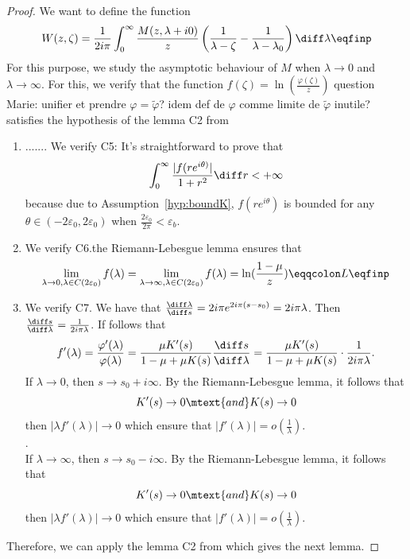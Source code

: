 \begin{proof}
We want to define the function
\begin{align}\label{def:W}
    W(z, \zeta) = \frac{1}{2i\pi }\int_0^\infty  \frac{M(z,\lambda+i0)}{z}\left( \frac{1}{\lambda-\zeta} - \frac{1}{\lambda-\lambda_0}\right) \diff \lambda 
    \eqfinp
\end{align}
For this purpose, we study the asymptotic behaviour of $M$ when $\lambda \to 0$ and $\lambda \to \infty$. For this, we verify that the function $f(\zeta) = \ln(\frac{\varphi(\zeta)}{z})$ {\MD question Marie: unifier et prendre $\varphi=\tilde\varphi$? idem def de $\varphi$ comme limite de $\tilde\varphi$ inutile?} satisfies the hypothesis of the lemma C2 from \cite{escobedo2007fundamental}
\begin{enumerate}
\item .......   We verify C5: It's straightforward to prove that 
    $$\int_0^\infty \frac{|f(r e^{i\theta)}|}{1+r^2}\diff r < +\infty$$ because due to Assumption~\ref{hyp:boundK}, $f(re^{i\theta})$ is bounded for any $\theta \in (-2\varepsilon_0, 2\varepsilon_0)$ when $\frac{2\varepsilon_0}{2\pi} < \varepsilon_b$. 
    \item We verify C6.the Riemann-Lebesgue lemma ensures that 
    $$ \lim_{\lambda \to 0, \lambda \in C(2\varepsilon_0)} f(\lambda) = 
     \lim_{\lambda \to \infty, \lambda \in C(2\varepsilon_0)} f(\lambda)=\ln(\frac{1-\mu}{z}) 
 \eqqcolon L\eqfinp$$
    \item We verify C7. We have that $\frac{\diff \lambda}{\diff s} = 2i\pi e^{2i\pi(s-s_0)} = 2i\pi \lambda$. Then 
    $\frac{\diff s}{\diff \lambda} = \frac{1}{2i\pi\lambda}$. 
    If follows that 
    $$f'(\lambda) = \frac{\varphi'(\lambda)}{\varphi(\lambda)} = \frac{\mu K'(s)}{1 - \mu + \mu K(s)}\frac{\diff s}{\diff \lambda} = \frac{\mu K'(s)}{1 - \mu + \mu K(s)} \cdot \frac{1}{2i\pi\lambda}. $$
    If $\lambda \to 0$, then $s \to s_0+i\infty$. By the Riemann-Lebesgue lemma, it follows that $$K'(s) \to 0 \mtext{and} K(s) \to 0$$ then  $|\lambda f'(\lambda)| \to 0$ which ensure that $|f'(\lambda)| = o(\frac{1}{\lambda})$. \\. \\
    If $\lambda \to \infty$, then $s \to s_0-i\infty$. By the Riemann-Lebesgue lemma, it follows that $$K'(s) \to 0 \mtext{and} K(s) \to 0$$ then  $|\lambda f'(\lambda)| \to 0$ which ensure that $|f'(\lambda)| = o(\frac{1}{\lambda})$. \\
\end{enumerate}
Therefore, we can apply the lemma C2 from \cite{escobedo2007fundamental} which gives the next lemma. 


\end{proof}
